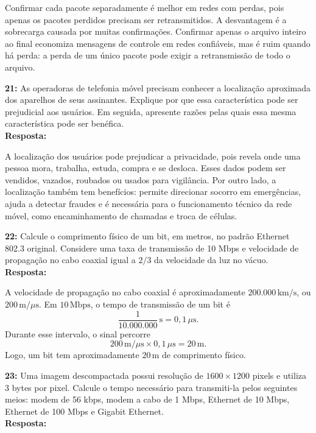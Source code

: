 \documentclass[12pt,a4paper]{report}
\begin{document}
Confirmar cada pacote separadamente é melhor em redes com perdas, pois apenas os pacotes perdidos precisam ser retransmitidos. A desvantagem é a sobrecarga causada por muitas confirmações. Confirmar apenas o arquivo inteiro ao final economiza mensagens de controle em redes confiáveis, mas é ruim quando há perda: a perda de um único pacote pode exigir a retransmissão de todo o arquivo.

\vspace{0.6cm}

\noindent \textbf{21:} As operadoras de telefonia móvel precisam conhecer a localização aproximada dos aparelhos de seus assinantes. Explique por que essa característica pode ser prejudicial aos usuários. Em seguida, apresente razões pelas quais essa mesma característica pode ser benéfica. \\
\textbf{Resposta:}

A localização dos usuários pode prejudicar a privacidade, pois revela onde uma pessoa mora, trabalha, estuda, compra e se desloca. Esses dados podem ser vendidos, vazados, roubados ou usados para vigilância. Por outro lado, a localização também tem benefícios: permite direcionar socorro em emergências, ajuda a detectar fraudes e é necessária para o funcionamento técnico da rede móvel, como encaminhamento de chamadas e troca de células.

\vspace{0.6cm}

\noindent \textbf{22:} Calcule o comprimento físico de um bit, em metros, no padrão Ethernet 802.3 original. Considere uma taxa de transmissão de 10 Mbps e velocidade de propagação no cabo coaxial igual a \(2/3\) da velocidade da luz no vácuo. \\
\textbf{Resposta:}

A velocidade de propagação no cabo coaxial é aproximadamente \(200.000\,\text{km/s}\), ou \(200\,\text{m}/\mu\text{s}\). Em \(10\,\text{Mbps}\), o tempo de transmissão de um bit é
\[
    \frac{1}{10.000.000}\,\text{s}=0{,}1\,\mu\text{s}.
\]
Durante esse intervalo, o sinal percorre
\[
    200\,\text{m}/\mu\text{s}\times 0{,}1\,\mu\text{s}=20\,\text{m}.
\]
Logo, um bit tem aproximadamente \(20\,\text{m}\) de comprimento físico.

\vspace{0.6cm}

\noindent \textbf{23:} Uma imagem descompactada possui resolução de \(1600 \times 1200\) pixels e utiliza 3 bytes por pixel. Calcule o tempo necessário para transmiti-la pelos seguintes meios: modem de 56 kbps, modem a cabo de 1 Mbps, Ethernet de 10 Mbps, Ethernet de 100 Mbps e Gigabit Ethernet. \\
\textbf{Resposta:}
\end{document}
